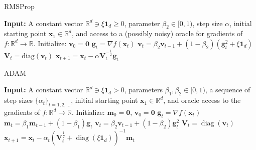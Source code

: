 \begin{algorithm}
    \caption{RMSProp}
    \label{alg:rmsprop}
    \begin{algorithmic}[1]
        \State \textbf{Input:} A constant vector $\mathbb{R}^d \ni \xi \mathbf{1}_d \geq 0$, parameter $\beta_2 \in [0, 1)$, step size $\alpha$, initial starting point $\mathbf{x}_1 \in \mathbb{R}^d$, and access to a (possibly noisy) oracle for gradients of $f : \mathbb{R}^d \rightarrow \mathbb{R}$.
            \State Initialize: $\mathbf{v}_0 = \mathbf{0}$
                \State $\mathbf{g}_t = \nabla f(\mathbf{x}_t)$
                \State $\mathbf{v}_t = \beta_2 \mathbf{v}_{t-1} + (1 - \beta_2)(\mathbf{g}_t^2 + \xi \mathbf{1}_d)$
                \State $\mathbf{V}_t = \text{diag}(\mathbf{v}_t)$
                \State $\mathbf{x}_{t+1} = \mathbf{x}_t - \alpha \mathbf{V}_t^{-\frac{1}{2}} \mathbf{g}_t$
            \EndFor
        \EndFunction
    \end{algorithmic}
\end{algorithm}
\vspace{-1cm}

\begin{algorithm}
    \caption{ADAM}
    \label{alg:adam}
    \begin{algorithmic}[1]
        \State \textbf{Input:} A constant vector $\mathbb{R}^d \ni \xi \mathbf{1}_d > 0$, parameters $\beta_1, \beta_2 \in [0, 1)$, a sequence of step sizes $\{\alpha_t\}_{t=1,2,\dots}$, initial starting point $\mathbf{x}_1 \in \mathbb{R}^d$, and oracle access to the gradients of $f : \mathbb{R}^d \to \mathbb{R}$.
            \State Initialize: $\mathbf{m}_0 = \mathbf{0}$, $\mathbf{v}_0 = \mathbf{0}$
                \State $\mathbf{g}_t = \nabla f(\mathbf{x}_t)$
                \State $\mathbf{m}_t = \beta_1 \mathbf{m}_{t-1} + (1 - \beta_1) \mathbf{g}_t$
                \State $\mathbf{v}_t = \beta_2 \mathbf{v}_{t-1} + (1 - \beta_2) \mathbf{g}_t^2$
                \State $\mathbf{V}_t = \operatorname{diag}(\mathbf{v}_t)$
                \State $\mathbf{x}_{t+1} = \mathbf{x}_t - \alpha_t \left( \mathbf{V}_t^{\frac{1}{2}} + \operatorname{diag}(\xi \mathbf{1}_d) \right)^{-1} \mathbf{m}_t$
            \EndFor
        \EndFunction
    \end{algorithmic}
\end{algorithm}